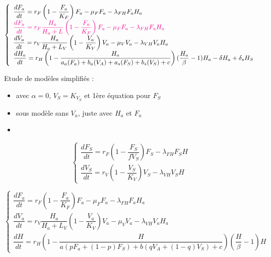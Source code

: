 \documentclass{article}
\newcommand{\marc}{\textcolor{magenta}}
\newcommand{\lf}{\lambda_{FH}}
\newcommand{\lv}{\lambda_{VH}}
\begin{document}
\begin{equation}    
\left\{ \begin{array}{l}
\dfrac{dF_a}{dt}=r_{F}\left(1-\dfrac{F_a}{K_{F}}\right)F_a - \mu_F F_a -\lf F_a H_a \\
\marc{\dfrac{dF_a}{dt}=r_{F} \dfrac{H_a}{H_a + L}\left(1-\dfrac{F_a}{K_{F}}\right)F_a - \mu_F F_a -\lf F_a H_a} \\
\dfrac{dV_a}{dt}=r_V \dfrac{H_a}{H_a + L_V} \left(1-\dfrac{V_a}{K_{V}}\right)V_a -\mu_V V_a -\lv V_a H_a\\
\dfrac{dH_a}{dt}=r_H \left(1-\dfrac{H_a}{a_a(F_a) + b_a(V_A) +a_s(F_S) + b_s(V_S) + c} \right)  (\dfrac{H_a}{\beta} - 1) H_a - \delta H_a + \delta_s H_S \\
\end{array}\right.
\label{model:simplified}
\end{equation}

Etude de modèles simplifiés : 
\begin{itemize}
\item avec $\alpha = 0$, $V_S = K_{V_S}$ et 1ère équation pour $F_S$
\item sous modèle sans $V_a$, juste avec $H_a$ et $F_a$
\item 
\end{itemize}

\begin{equation}    
\left\{ \begin{array}{l}
\dfrac{dF_S}{dt}=r_{F}\left(1-\dfrac{F_S}{f V_S}\right)F_S -\lf F_S   H \\
\dfrac{dV_S}{dt}=r_V \left(1-\dfrac{V_S}{K_{V}}\right)V_S  -\lv V_S H
\end{array}\right.
\label{model:simplified}
\end{equation}

\begin{equation}    
\left\{ \begin{array}{l}
\dfrac{dF_a}{dt}=r_{F}\left(1-\dfrac{F_a}{K_{F}}\right)F_a - \mu_F F_a -\lf F_a H_a \\
\dfrac{dV_a}{dt}=r_V \dfrac{H_a}{H_a + L_V} \left(1-\dfrac{V_a}{K_{V}}\right)V_a -\mu_V V_a -\lv V_a H_a\\
\dfrac{dH}{dt}=r_H \left(1-\dfrac{H}{a(p F_a + (1-p)F_S) + b(qV_A + (1-q)V_S) + c} \right)  (\dfrac{H}{\beta} - 1) H 
\end{array}\right.
\label{model:simplified}
\end{equation}
\end{document}
